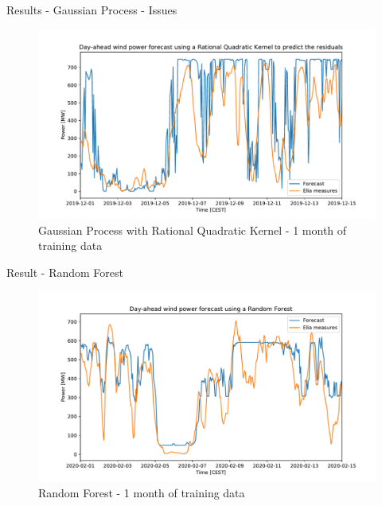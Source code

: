 \documentclass[12pt]{beamer}
\begin{document}
\begin{frame}{Results - Gaussian Process - Issues}
    \begin{figure}
        \centering
        \includegraphics[width=\textwidth]{resources/pdf/idem_sooner_r.pdf}
        \caption{Gaussian Process with Rational Quadratic Kernel - 1 month of training data}
    \end{figure}
\end{frame}

\begin{frame}{Result - Random Forest}
    \begin{figure}
        \centering
        \includegraphics[width=\textwidth]{resources/pdf/rf_one_month.pdf}
        \caption{Random Forest - 1 month of training data}
    \end{figure}
\end{frame}
\end{document}
